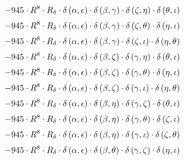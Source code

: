 \begin{subequations}
\begin{gather}
 \\[0.2em] \notag 		 - 945 \cdot R^{8} \cdot R_{\delta{}} \cdot \delta{}\left(\alpha{}, \epsilon{}\right) \cdot \delta{}\left(\beta{}, \gamma{}\right) \cdot \delta{}\left(\zeta{}, \eta{}\right) \cdot \delta{}\left(\theta{}, \iota{}\right) 
 \\[0.2em] \notag 		 - 945 \cdot R^{8} \cdot R_{\delta{}} \cdot \delta{}\left(\alpha{}, \epsilon{}\right) \cdot \delta{}\left(\beta{}, \gamma{}\right) \cdot \delta{}\left(\zeta{}, \theta{}\right) \cdot \delta{}\left(\eta{}, \iota{}\right) 
 \\[0.2em] \notag 		 - 945 \cdot R^{8} \cdot R_{\delta{}} \cdot \delta{}\left(\alpha{}, \epsilon{}\right) \cdot \delta{}\left(\beta{}, \gamma{}\right) \cdot \delta{}\left(\zeta{}, \iota{}\right) \cdot \delta{}\left(\eta{}, \theta{}\right) 
 \\[0.2em] \notag 		 - 945 \cdot R^{8} \cdot R_{\delta{}} \cdot \delta{}\left(\alpha{}, \epsilon{}\right) \cdot \delta{}\left(\beta{}, \zeta{}\right) \cdot \delta{}\left(\gamma{}, \eta{}\right) \cdot \delta{}\left(\theta{}, \iota{}\right) 
 \\[0.2em] \notag 		 - 945 \cdot R^{8} \cdot R_{\delta{}} \cdot \delta{}\left(\alpha{}, \epsilon{}\right) \cdot \delta{}\left(\beta{}, \zeta{}\right) \cdot \delta{}\left(\gamma{}, \theta{}\right) \cdot \delta{}\left(\eta{}, \iota{}\right) 
 \\[0.2em] \notag 		 - 945 \cdot R^{8} \cdot R_{\delta{}} \cdot \delta{}\left(\alpha{}, \epsilon{}\right) \cdot \delta{}\left(\beta{}, \zeta{}\right) \cdot \delta{}\left(\gamma{}, \iota{}\right) \cdot \delta{}\left(\eta{}, \theta{}\right) 
 \\[0.2em] \notag 		 - 945 \cdot R^{8} \cdot R_{\delta{}} \cdot \delta{}\left(\alpha{}, \epsilon{}\right) \cdot \delta{}\left(\beta{}, \eta{}\right) \cdot \delta{}\left(\gamma{}, \zeta{}\right) \cdot \delta{}\left(\theta{}, \iota{}\right) 
 \\[0.2em] \notag 		 - 945 \cdot R^{8} \cdot R_{\delta{}} \cdot \delta{}\left(\alpha{}, \epsilon{}\right) \cdot \delta{}\left(\beta{}, \eta{}\right) \cdot \delta{}\left(\gamma{}, \theta{}\right) \cdot \delta{}\left(\zeta{}, \iota{}\right) 
 \\[0.2em] \notag 		 - 945 \cdot R^{8} \cdot R_{\delta{}} \cdot \delta{}\left(\alpha{}, \epsilon{}\right) \cdot \delta{}\left(\beta{}, \eta{}\right) \cdot \delta{}\left(\gamma{}, \iota{}\right) \cdot \delta{}\left(\zeta{}, \theta{}\right) 
 \\[0.2em] \notag 		 - 945 \cdot R^{8} \cdot R_{\delta{}} \cdot \delta{}\left(\alpha{}, \epsilon{}\right) \cdot \delta{}\left(\beta{}, \theta{}\right) \cdot \delta{}\left(\gamma{}, \zeta{}\right) \cdot \delta{}\left(\eta{}, \iota{}\right) 

\end{gather}
\end{subequations}
